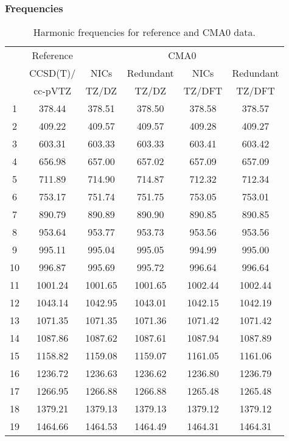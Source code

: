 \documentclass[10pt,oneside]{article}
\begin{document}
\begin{table}[h!]
\subsubsection*{Frequencies}
\centering
\caption{Harmonic frequencies for reference and CMA0 data.}
\begin{tabular}{cccccc}
\toprule
{} & Reference & \multicolumn{4}{c}{CMA0} \\
{} &  CCSD(T)/ &    NICs &  Redundant &    NICs & Redundant \\
{} &   cc-pVTZ &   TZ/DZ &      TZ/DZ &  TZ/DFT &    TZ/DFT \\
\midrule
1  &    378.44 &  378.51 &     378.50 &  378.58 &    378.57 \\
2  &    409.22 &  409.57 &     409.57 &  409.28 &    409.27 \\
3  &    603.31 &  603.33 &     603.33 &  603.41 &    603.42 \\
4  &    656.98 &  657.00 &     657.02 &  657.09 &    657.09 \\
5  &    711.89 &  714.90 &     714.87 &  712.32 &    712.34 \\
6  &    753.17 &  751.74 &     751.75 &  753.05 &    753.01 \\
7  &    890.79 &  890.89 &     890.90 &  890.85 &    890.85 \\
8  &    953.64 &  953.77 &     953.73 &  953.56 &    953.56 \\
9  &    995.11 &  995.04 &     995.05 &  994.99 &    995.00 \\
10 &    996.87 &  995.69 &     995.72 &  996.64 &    996.64 \\
11 &   1001.24 & 1001.65 &    1001.65 & 1002.44 &   1002.44 \\
12 &   1043.14 & 1042.95 &    1043.01 & 1042.15 &   1042.19 \\
13 &   1071.35 & 1071.35 &    1071.36 & 1071.42 &   1071.42 \\
14 &   1087.86 & 1087.62 &    1087.61 & 1087.94 &   1087.89 \\
15 &   1158.82 & 1159.08 &    1159.07 & 1161.05 &   1161.06 \\
16 &   1236.72 & 1236.63 &    1236.62 & 1236.80 &   1236.79 \\
17 &   1266.95 & 1266.88 &    1266.88 & 1265.48 &   1265.48 \\
18 &   1379.21 & 1379.13 &    1379.13 & 1379.12 &   1379.12 \\
19 &   1464.66 & 1464.53 &    1464.49 & 1464.31 &   1464.31 \\

\end{tabular}
\end{table}
\end{document}
